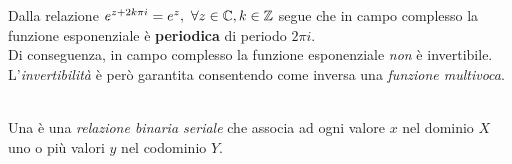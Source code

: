 \begin{observe}
	Dalla relazione $e^{z+2k\pi i}=e^z,\ \forall z\in\complexset, k\in\integerset$ segue che in campo complesso la funzione esponenziale è \textbf{periodica} di periodo $2\pi i$.\\
	Di conseguenza, in campo complesso la funzione esponenziale \textit{non} è invertibile.\\
	L'\textit{invertibilità} è però garantita consentendo come inversa una \textit{funzione multivoca}.
\end{observe}
\begin{define}~{}\\
	Una  è una \textit{relazione binaria seriale} che associa ad ogni valore $x$ nel dominio $X$ uno o più valori $y$ nel codominio $Y$.
\end{define}
